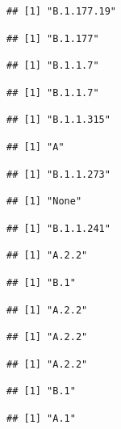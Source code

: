\documentclass[
]{article}
\begin{document}
\begin{verbatim}
## [1] "B.1.177.19"
\end{verbatim}

\begin{verbatim}
## [1] "B.1.177"
\end{verbatim}

\begin{verbatim}
## [1] "B.1.1.7"
\end{verbatim}

\begin{verbatim}
## [1] "B.1.1.7"
\end{verbatim}

\begin{verbatim}
## [1] "B.1.1.315"
\end{verbatim}

\begin{verbatim}
## [1] "A"
\end{verbatim}

\begin{verbatim}
## [1] "B.1.1.273"
\end{verbatim}

\begin{verbatim}
## [1] "None"
\end{verbatim}

\begin{verbatim}
## [1] "B.1.1.241"
\end{verbatim}

\begin{verbatim}
## [1] "A.2.2"
\end{verbatim}

\begin{verbatim}
## [1] "B.1"
\end{verbatim}

\begin{verbatim}
## [1] "A.2.2"
\end{verbatim}

\begin{verbatim}
## [1] "A.2.2"
\end{verbatim}

\begin{verbatim}
## [1] "A.2.2"
\end{verbatim}

\begin{verbatim}
## [1] "B.1"
\end{verbatim}

\begin{verbatim}
## [1] "A.1"
\end{verbatim}
\end{document}

